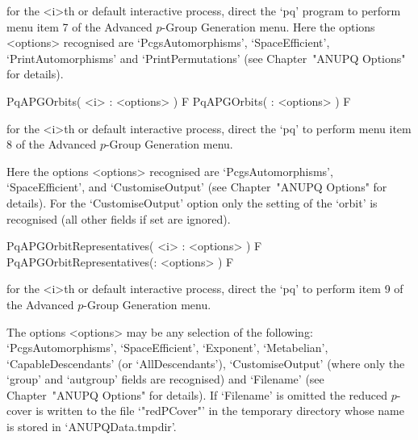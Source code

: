 
for the  <i>th or default  interactive {\ANUPQ} process, direct  the `pq'
program to perform menu item 7 of the Advanced $p$-Group Generation menu.
Here   the   options   <options>  recognised   are   `PcgsAutomorphisms',
`SpaceEfficient',   `PrintAutomorphisms'  and   `PrintPermutations'  (see
Chapter~"ANUPQ Options" for details).


\>PqAPGOrbits( <i> : <options> ) F
\>PqAPGOrbits( : <options> ) F


for the  <i>th or default  interactive {\ANUPQ} process, direct  the `pq'
to perform menu item 8 of the Advanced $p$-Group Generation menu.

Here   the   options   <options>  recognised   are   `PcgsAutomorphisms',
`SpaceEfficient', and `CustomiseOutput'  (see Chapter~"ANUPQ Options" for
details).   For the  `CustomiseOutput'  option only  the  setting of  the
`orbit' is recognised (all other fields if set are ignored).


\>PqAPGOrbitRepresentatives( <i> : <options> ) F
\>PqAPGOrbitRepresentatives(: <options> ) F


for the  <i>th or default  interactive {\ANUPQ} process, direct  the `pq'
to perform item 9 of the Advanced $p$-Group Generation menu.

The  options  <options>  may  be  any   selection   of   the   following:
`PcgsAutomorphisms',    `SpaceEfficient',    `Exponent',    `Metabelian',
`CapableDescendants' (or `AllDescendants'), `CustomiseOutput' (where only
the `group' and `autgroup' fields are  recognised)  and  `Filename'  (see
Chapter~"ANUPQ Options"  for  details).  If  `Filename'  is  omitted  the
reduced $p$-cover is written to the file `"redPCover"' in  the  temporary
directory whose name is stored in `ANUPQData.tmpdir'.

